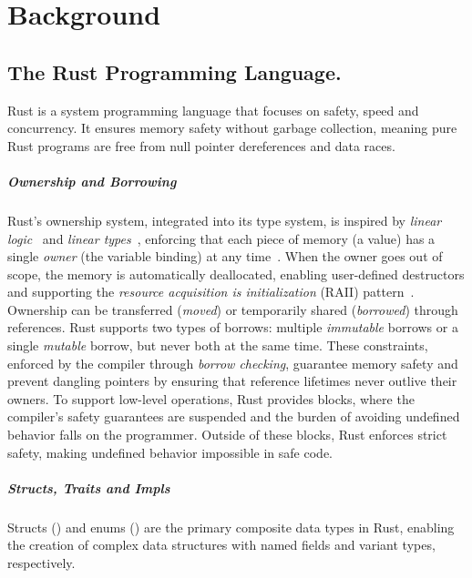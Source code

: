 \chapter{Background}\label{chap:background}


\section{The Rust Programming Language.}\label{sec:rust}
Rust is a system programming language that focuses on safety, speed and concurrency.
It ensures memory safety without garbage collection, meaning pure Rust programs are free from null pointer dereferences and data races.

\paragraph{Ownership and Borrowing}
Rust's ownership system, integrated into its type system, is inspired by \textit{linear logic}~\cite{Girard87, Girard95} and \textit{linear types}~\cite{Wadler90, Odersky92}, enforcing that each piece of memory (a value) has a single \textit{owner} (the variable binding) at any time~\cite{Clarke98, Boyapati02}.
When the owner goes out of scope, the memory is automatically deallocated, enabling user-defined destructors and supporting the \textit{resource acquisition is initialization} (RAII) pattern~\cite{Stroustrup94}.
Ownership can be transferred (\textit{moved}) or temporarily shared (\textit{borrowed}) through references.
Rust supports two types of borrows: multiple \textit{immutable} borrows or a single \textit{mutable} borrow, but never both at the same time.
These constraints, enforced by the compiler through \textit{borrow checking}, guarantee memory safety and prevent dangling pointers by ensuring that reference lifetimes never outlive their owners.
To support low-level operations, Rust provides  blocks, where the compiler's safety guarantees are suspended and the burden of avoiding undefined behavior falls on the programmer.
Outside of these blocks, Rust enforces strict safety, making undefined behavior impossible in safe code.

\paragraph{Structs, Traits and Impls}
Structs () and enums () are the primary composite data types in Rust, enabling the creation of complex data structures with named fields and variant types, respectively.


